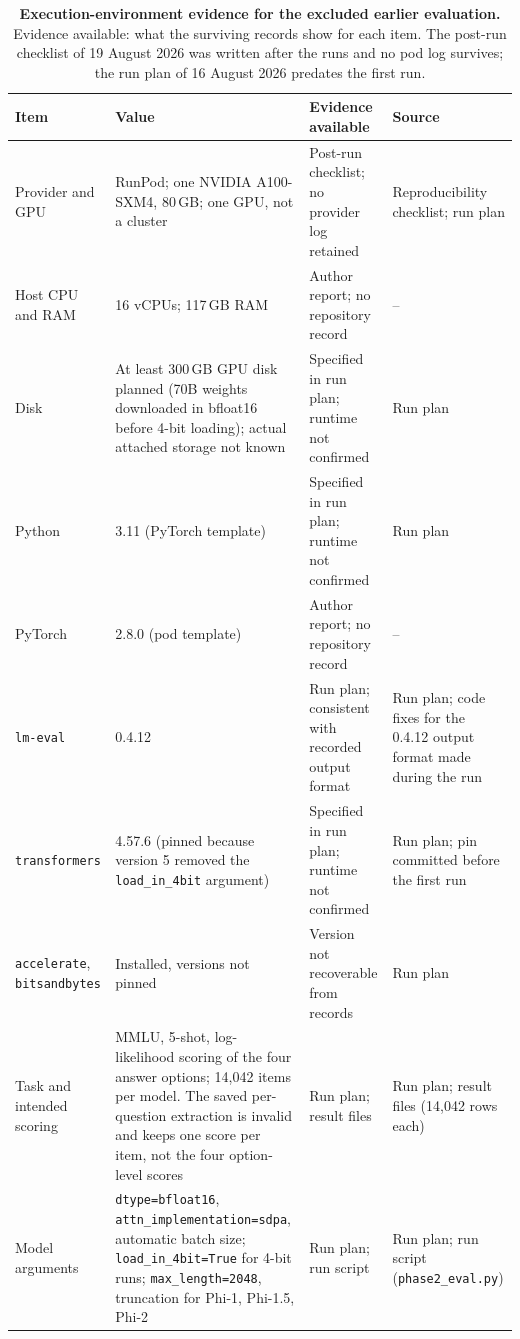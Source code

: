 \documentclass[10pt]{article}
\begin{document}
\begin{table}[H]
\caption{\textbf{Execution-environment evidence for the excluded earlier evaluation.} Evidence available: what the surviving records show for each item. The post-run checklist of 19 August 2026 was written after the runs and no pod log survives; the run plan of 16 August 2026 predates the first run.}
\label{tab:runpodenv}
\centering
\footnotesize
\setlength{\tabcolsep}{3pt}
\begin{tabular}{p{}p{}p{}p{}}
\toprule
Item & Value & Evidence available & Source \\
\midrule
Provider and GPU & RunPod; one NVIDIA A100-SXM4, 80\,GB; one GPU, not a cluster & Post-run checklist; no provider log retained & Reproducibility checklist; run plan \\
Host CPU and RAM & 16 vCPUs; 117\,GB RAM & Author report; no repository record & -- \\
Disk & At least 300\,GB GPU disk planned (70B weights downloaded in bfloat16 before 4-bit loading); actual attached storage not known & Specified in run plan; runtime not confirmed & Run plan \\
Python & 3.11 (PyTorch template) & Specified in run plan; runtime not confirmed & Run plan \\
PyTorch & 2.8.0 (pod template) & Author report; no repository record & -- \\
\texttt{lm-eval} & 0.4.12 & Run plan; consistent with recorded output format & Run plan; code fixes for the 0.4.12 output format made during the run \\
\texttt{transformers} & 4.57.6 (pinned because version 5 removed the \texttt{load\_in\_4bit} argument) & Specified in run plan; runtime not confirmed & Run plan; pin committed before the first run \\
\texttt{accelerate}, \texttt{bitsandbytes} & Installed, versions not pinned & Version not recoverable from records & Run plan \\
Task and intended scoring & MMLU, 5-shot, log-likelihood scoring of the four answer options; 14{,}042 items per model. The saved per-question extraction is invalid and keeps one score per item, not the four option-level scores & Run plan; result files & Run plan; result files (14{,}042 rows each) \\
Model arguments & \texttt{dtype=bfloat16}, \texttt{attn\_implementation=sdpa}, automatic batch size; \texttt{load\_in\_4bit=True} for 4-bit runs; \texttt{max\_length=2048}, truncation for Phi-1, Phi-1.5, Phi-2 & Run plan; run script & Run plan; run script (\texttt{phase2\_eval.py}) \\

\end{tabular}
\end{table}
\end{document}

